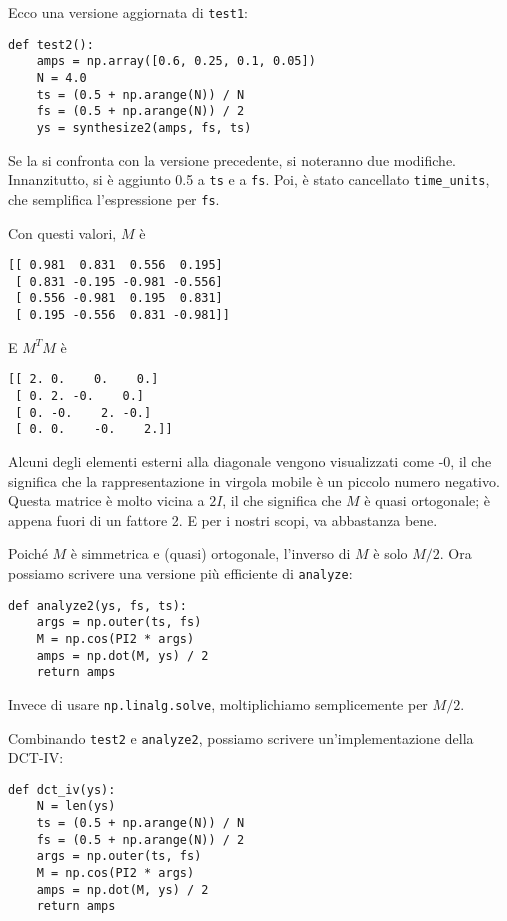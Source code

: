 \documentclass[12pt]{book} \usepackage[width=5.5in,height=8.5in, hmarginratio=3:2,vmarginratio=1:1]{geometry}
\begin{document}
Ecco una versione aggiornata di {\tt test1}:

\begin{verbatim} 
def test2():
    amps = np.array([0.6, 0.25, 0.1, 0.05])
    N = 4.0
    ts = (0.5 + np.arange(N)) / N
    fs = (0.5 + np.arange(N)) / 2
    ys = synthesize2(amps, fs, ts)
 \end{verbatim} 

Se la si confronta con la versione precedente, si noteranno due modifiche. Innanzitutto, si è aggiunto 0.5 a {\tt ts} e a {\tt fs}. Poi, è stato cancellato \verb"time_units", che semplifica l'espressione per {\tt fs}.

Con questi valori, $M$ è

\begin{verbatim} 
[[ 0.981  0.831  0.556  0.195]
 [ 0.831 -0.195 -0.981 -0.556]
 [ 0.556 -0.981  0.195  0.831]
 [ 0.195 -0.556  0.831 -0.981]]
 \end{verbatim} 

E $M^TM$ è

\begin{verbatim} 
[[ 2. 0.    0.    0.]
 [ 0. 2. -0.    0.]
 [ 0. -0.    2. -0.]
 [ 0. 0.    -0.    2.]]
 \end{verbatim} 

Alcuni degli elementi esterni alla diagonale vengono visualizzati come -0, il che significa che la rappresentazione in virgola mobile è un piccolo numero negativo. Questa matrice è molto vicina a $2I$, il che significa che $M$ è quasi ortogonale; è appena fuori di un fattore 2. E per i nostri scopi, va abbastanza bene.

Poiché $M$ è simmetrica e (quasi) ortogonale, l'inverso di $M$ è solo $M/2$. Ora possiamo scrivere una versione più efficiente di {\tt analyze}:

\begin{verbatim} 
def analyze2(ys, fs, ts):
    args = np.outer(ts, fs)
    M = np.cos(PI2 * args)
    amps = np.dot(M, ys) / 2
    return amps
 \end{verbatim} 

Invece di usare {\tt np.linalg.solve}, moltiplichiamo semplicemente per $M/2$.

Combinando {\tt test2} e {\tt analyze2}, possiamo scrivere un'implementazione della DCT-IV:

\begin{verbatim} 
def dct_iv(ys):
    N = len(ys)
    ts = (0.5 + np.arange(N)) / N
    fs = (0.5 + np.arange(N)) / 2
    args = np.outer(ts, fs)
    M = np.cos(PI2 * args)
    amps = np.dot(M, ys) / 2
    return amps
 \end{verbatim} 
\end{document}
